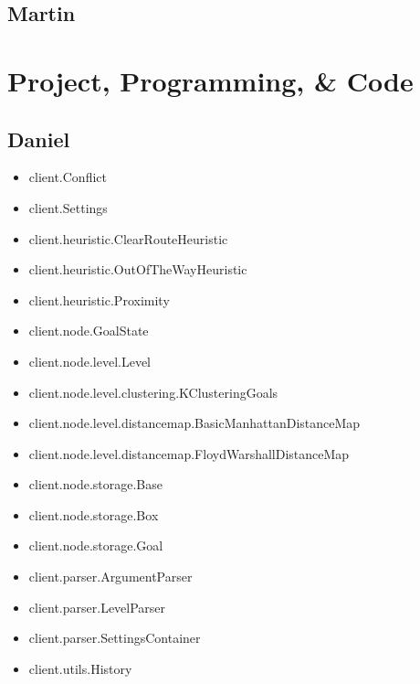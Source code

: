 \documentclass[10pt,a4paper]{article}
\begin{document}
	\subsection{Martin}

\section{Project, Programming, \& Code}
	\subsection{Daniel}
		\begin{itemize}
			\item client.Conflict
	 		\item client.Settings
	 		\item client.heuristic.ClearRouteHeuristic
	 		\item client.heuristic.OutOfTheWayHeuristic
	 		\item client.heuristic.Proximity
	 		\item client.node.GoalState
	 		\item client.node.level.Level
	 		\item client.node.level.clustering.KClusteringGoals
	 		\item client.node.level.distancemap.BasicManhattanDistanceMap
	 		\item client.node.level.distancemap.FloydWarshallDistanceMap
	 		\item client.node.storage.Base
	 		\item client.node.storage.Box
	 		\item client.node.storage.Goal
	 		\item client.parser.ArgumentParser
	 		\item client.parser.LevelParser
	 		\item client.parser.SettingsContainer
	 		\item client.utils.History
		\end{itemize}
\end{document}
